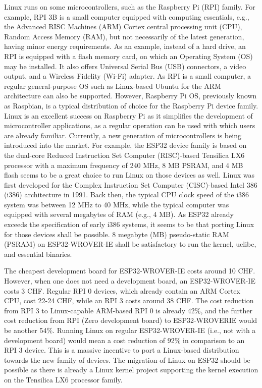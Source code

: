 Linux runs on some microcontrollers, such as the Raspberry Pi (RPI) family. For example, RPI 3B is a small computer equipped with computing essentials, e.g., the Advanced RISC Machines (ARM) Cortex central processing unit (CPU), Random Access Memory (RAM), but not necessarily of the latest generation, having minor energy requirements. As an example, instead of a hard drive, an RPI is equipped with a flash memory card, on which an Operating System (OS) may be installed. It also offers Universal Serial Bus (USB) connectors, a video output, and a Wireless Fidelity (Wi-Fi) adapter. As RPI is a small computer, a regular general-purpose OS such as Linux-based Ubuntu for the ARM architecture can also be supported. However, Raspberry Pi OS, previously known as Raspbian, is a typical distribution of choice for the Raspberry Pi device family. Linux is an excellent success on Raspberry Pi as it simplifies the development of microcontroller applications, as a regular operation can be used with which users are already familiar. Currently, a new generation of microcontrollers is being introduced into the market. For example, the ESP32 device family is based on the dual-core Reduced Instruction Set Computer (RISC)-based Tensilica LX6 processor with a maximum frequency of 240 MHz, 8 MB PSRAM, and 4 MB flash seems to be a great choice to run Linux on those devices as well. Linux was first developed for the Complex Instruction Set Computer (CISC)-based Intel 386 (i386) architecture in 1991. Back then, the typical CPU clock speed of the i386 system was between 12 MHz to 40 MHz, while the typical computer was equipped with several megabytes of RAM (e.g., 4 MB). As ESP32 already exceeds the specification of early i386 systems, it seems to be that porting Linux for those devices shall be possible. 8 megabyte (MB) pseudo-static RAM (PSRAM) on ESP32-WROVER-IE shall be satisfactory to run the kernel, uclibc, and essential binaries. 

The cheapest development board for ESP32-WROVER-IE costs around 10 CHF. However, when one does not need a development board, an ESP32-WROVER-IE costs 3 CHF. Regular RPI 0 devices, which already contain an ARM Cortex CPU, cost 22-24 CHF, while an RPI 3 costs around 38 CHF. The cost reduction from RPI 3 to Linux-capable ARM-based RPI 0 is already 42\%, and the further cost reduction from RPI (Zero development board) to ESP32-WROVERIE would be another 54\%. Running Linux on regular ESP32-WROVER-IE (i.e., not with a development board) would mean a cost reduction of 92\% in comparison to an RPI 3 device. This is a massive incentive to port a Linux-based distribution towards the new family of devices. The migration of Linux on ESP32 should be possible as there is already a Linux kernel project supporting the kernel execution on the Tensilica LX6 processor family.


